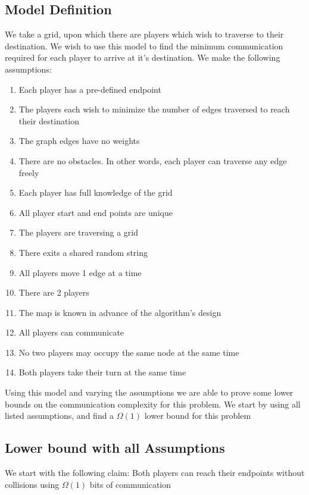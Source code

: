 \documentclass[12pt,letterpaper]{article}
\begin{document}
\subsection{Model Definition}

We take a grid, upon which there are players which wish to traverse to their
destination. We wish to use this model to find the minimum communication
required for each player to arrive at it's destination. We make the following
assumptions:

\begin{enumerate}
	\item Each player has a pre-defined endpoint
	\item The players each wish to minimize the number of edges traversed to
		reach their destination
	\item The graph edges have no weights
	\item There are no obstacles. In other words, each player can traverse
		any edge freely
	\item Each player has full knowledge of the grid
	\item All player start and end points are unique
	\item The players are traversing a grid
	\item There exits a shared random string
	\item All players move 1 edge at a time
	\item There are 2 players
	\item The map is known in advance of the algorithm's design
	\item All players can communicate
	\item No two players may occupy the same node at the same time
	\item Both players take their turn at the same time
\end{enumerate}

Using this model and varying the assumptions we are able to prove some lower
bounds on the communication complexity for this problem. We start by using all
listed assumptions, and find a $\Omega(1)$ lower bound for this problem

\subsection{Lower bound with all Assumptions}

We start with the following claim: Both players can reach their endpoints without collisions using
	$\Omega(1)$ bits of communication
\end{document}
